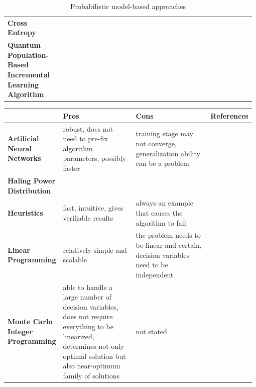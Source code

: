 \documentclass[12pt]{article}
\begin{document}
\begin{landscape}
\begin{table}
\begin{tabular}{  p{0.2\linewidth} p{0.34\linewidth} p{0.34\linewidth} p{0.1\linewidth} }
 \textbf{Cross Entropy} & \textcolor{medblue}{} & \textcolor{medblue}{} & \textcolor{medblue}{\cite{De-Moura-Meneses:2015}} \\
 
 \textbf{Quantum Population-Based Incremental Learning Algorithm} & \textcolor{medblue}{} & \textcolor{medblue}{} &  \textcolor{medblue}{\cite{Silva:2011,Silva:2011a,Silva:2014}} \\
 
 \hline
\end{tabular}
\caption{Probabilistic model-based approaches}\label{table:probmethod} 
\end{table}
\end{landscape}


\begin{landscape}
\begin{table}
	\singlespacing
	\footnotesize
\begin{tabular}{  p{0.2\linewidth} p{0.34\linewidth} p{0.34\linewidth} p{0.1\linewidth} }
 \hline
 &  \textbf{Pros}  & \textbf{Cons} & \textbf{References} \\
 \hline
 
 \textbf{Artificial Neural Networks} & \textcolor{medblue}{robust, does not need to pre-fix algorithm parameters, possibly faster} & \textcolor{medblue}{training stage may not converge, generalization ability can be a problem} & \textcolor{medblue}{\cite{Faria:2003,Ortiz:2004,Ortiz-Servin:2011,Yamamoto:2003,Erdoan:2003,Ziver:2004,Sadighi:2003,Fadaei:2008}} \\
 
 \textbf{Haling Power Distribution} & & & \textcolor{medblue}{\cite{Guler:2004,Feltus:1995,Burte:1993,Haling:1964,Alim:2008,Levine:2013}} \\
 
 \textbf{Heuristics} & \textcolor{medblue}{fast, intuitive, gives verifiable results} & \textcolor{medblue}{always an example that causes the algorithm to fail} & \textcolor{medblue}{\cite{Zerovnik:2009,Francois:1999,Kim:2007,Tsvetkov:2011}} \\
 
 \textbf{Linear Programming} & \textcolor{medblue}{relatively simple and scalable} & \textcolor{medblue}{the problem needs to be linear and certain, decision variables need to be independent} & \textcolor{medblue}{\cite{Miller:1975,Okafor:1988,Stillman:1989,Motoda:1975,Mahlers:1997,Kim:1997}} \\
 
 \textbf{Monte Carlo Integer Programming} & \textcolor{medblue}{able to handle a large number of decision variables, does not require everything to be linearized, determines not only optimal solution but also near-optimum family of solutions} & \textcolor{medblue}{not stated} & \textcolor{medblue}{\cite{Comes:1988}}  \\
 

\end{tabular}
\end{table}
\end{landscape}
\end{document}
